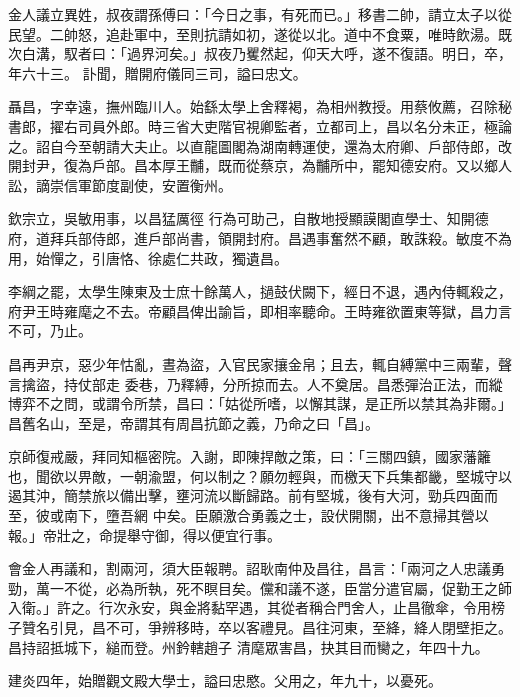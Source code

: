 \begin{pinyinscope}
 金人議立異姓，叔夜謂孫傅曰：「今日之事，有死而已。」移書二帥，請立太子以從民望。二帥怒，追赴軍中，至則抗請如初，遂從以北。道中不食粟，唯時飲湯。既次白溝，馭者曰：「過界河矣。」叔夜乃矍然起，仰天大呼，遂不復語。明日，卒，年六十三。
 訃聞，贈開府儀同三司，謚曰忠文。



 聶昌，字幸遠，撫州臨川人。始繇太學上舍釋褐，為相州教授。用蔡攸薦，召除秘書郎，擢右司員外郎。時三省大吏階官視卿監者，立都司上，昌以名分未正，極論之。詔自今至朝請大夫止。以直龍圖閣為湖南轉運使，還為太府卿、戶部侍郎，改開封尹，復為戶部。昌本厚王黼，既而從蔡京，為黼所中，罷知德安府。又以鄉人訟，謫崇信軍節度副使，安置衡州。



 欽宗立，吳敏用事，以昌猛厲徑
 行為可助己，自散地授顯謨閣直學士、知開德府，道拜兵部侍郎，進戶部尚書，領開封府。昌遇事奮然不顧，敢誅殺。敏度不為用，始憚之，引唐恪、徐處仁共政，獨遺昌。



 李綱之罷，太學生陳東及士庶十餘萬人，撾鼓伏闕下，經日不退，遇內侍輒殺之，府尹王時雍麾之不去。帝顧昌俾出諭旨，即相率聽命。王時雍欲置東等獄，昌力言不可，乃止。



 昌再尹京，惡少年怙亂，晝為盜，入官民家攘金帛；且去，輒自縛黨中三兩輩，聲言擒盜，持仗部走
 委巷，乃釋縛，分所掠而去。人不奠居。昌悉彈治正法，而縱博弈不之問，或謂令所禁，昌曰：「姑從所嗜，以懈其謀，是正所以禁其為非爾。」昌舊名山，至是，帝謂其有周昌抗節之義，乃命之曰「昌」。



 京師復戒嚴，拜同知樞密院。入謝，即陳捍敵之策，曰：「三關四鎮，國家藩籬也，聞欲以畀敵，一朝渝盟，何以制之？願勿輕與，而檄天下兵集都畿，堅城守以遏其沖，簡禁旅以備出擊，壅河流以斷歸路。前有堅城，後有大河，勁兵四面而至，彼或南下，墮吾網
 中矣。臣願激合勇義之士，設伏開關，出不意掃其營以報。」帝壯之，命提舉守御，得以便宜行事。



 會金人再議和，割兩河，須大臣報聘。詔耿南仲及昌往，昌言：「兩河之人忠議勇勁，萬一不從，必為所執，死不瞑目矣。儻和議不遂，臣當分遣官屬，促勤王之師入衛。」許之。行次永安，與金將黏罕遇，其從者稱合門舍人，止昌徹傘，令用榜子贊名引見，昌不可，爭辨移時，卒以客禮見。昌往河東，至絳，絳人閉壁拒之。昌持詔抵城下，縋而登。州鈐轄趙子
 清麾眾害昌，抉其目而臠之，年四十九。



 建炎四年，始贈觀文殿大學士，謚曰忠愍。父用之，年九十，以憂死。




\end{pinyinscope}
